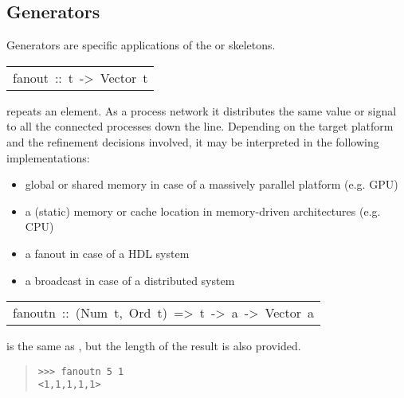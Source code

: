 \subsection{Generators}
Generators are specific applications of the  or
  skeletons.\par

\begin{haddockdesc}
\item[\begin{tabular}{@{}l}
fanout\ ::\ t\ ->\ Vector\ t
\end{tabular}]\haddockbegindoc
{} repeats an element. As a process network it distributes
 the same value or signal to all the connected processes down the
 line. Depending on the target platform and the refinement decisions
 involved, it may be interpreted in the following implementations:\par
\begin{itemize}
\item
global or shared memory in case of a massively parallel platform
  (e.g. GPU)\par

\item
a (static) memory or cache location in memory-driven
  architectures (e.g. CPU)\par

\item
a fanout in case of a HDL system\par

\item
a broadcast in case of a distributed system\par

\end{itemize}

\end{haddockdesc}
\begin{haddockdesc}
\item[\begin{tabular}{@{}l}
fanoutn\ ::\ (Num\ t,\ Ord\ t)\ =>\ t\ ->\ a\ ->\ Vector\ a
\end{tabular}]\haddockbegindoc
{} is the same as , but the length of the result
 is also provided.\par
\begin{quote}
{\haddockverb\begin{verbatim}
>>> fanoutn 5 1
<1,1,1,1,1>

\end{verbatim}}
\end{quote}
\end{haddockdesc}
